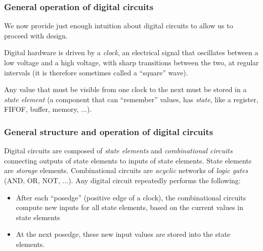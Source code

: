 \begin{frame}
\frametitle{General operation of digital circuits}

\footnotesize

We now provide just enough intuition about digital circuits to allow
us to proceed with {\BSV} design.

\vspace*{5ex}

Digital hardware is driven by a \emph{clock}, an electrical signal
that oscillates between a low voltage and a high voltage, with sharp
transitions between the two, at regular intervals (it is therefore
sometimes called a ``square'' wave).

\vspace{1ex}

\begin{center}
\end{center}

\vspace{1ex}

Any value that must be visible from one clock to the next must be
stored in a \emph{state element} (a component that can ``remember''
values, {\ie} has \emph{state}, like a register, FIFOF, buffer,
memory, ...).

\end{frame}


\begin{frame}
\frametitle{General structure and operation of digital circuits}

\footnotesize

\begin{center}
\end{center}

Digital circuits are composed of \emph{state elements} and
\emph{combinational circuits} connecting outputs of state elements to
inputs of state elements.  State elements are \emph{storage} elements.
Combinational circuits are \emph{acyclic} networks of \emph{logic
gates} (AND, OR, NOT, ...).  Any digital circuit repeatedly performs
the following:

\begin{itemize}

\item After each ``posedge'' (positive edge of a clock), the
      combinational circuits compute new inputs for all state
      elements, based on the current values in state elements

\item At the next posedge, these new input values are stored into the
      state elements.

\end{itemize}

\end{frame}


